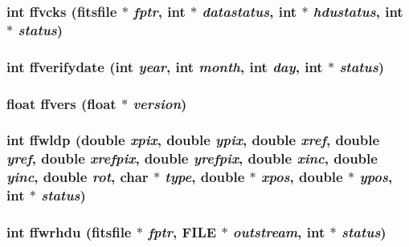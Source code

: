 \subsubsection{\setlength{\rightskip}{0pt plus 5cm}int ffvcks (\bf{fitsfile} $\ast$ {\em fptr}, int $\ast$ {\em datastatus}, int $\ast$ {\em hdustatus}, int $\ast$ {\em status})}\label{src_2fitsio_8h_78bc390746f669a461a78c81ed6d188c}


\subsubsection{\setlength{\rightskip}{0pt plus 5cm}int ffverifydate (int {\em year}, int {\em month}, int {\em day}, int $\ast$ {\em status})}\label{src_2fitsio_8h_80394f484665daa6cc2baf0176437ca8}


\subsubsection{\setlength{\rightskip}{0pt plus 5cm}float ffvers (float $\ast$ {\em version})}\label{src_2fitsio_8h_85c66845501bf130675ce90fede1adb4}


\subsubsection{\setlength{\rightskip}{0pt plus 5cm}int ffwldp (double {\em xpix}, double {\em ypix}, double {\em xref}, double {\em yref}, double {\em xrefpix}, double {\em yrefpix}, double {\em xinc}, double {\em yinc}, double {\em rot}, char $\ast$ {\em type}, double $\ast$ {\em xpos}, double $\ast$ {\em ypos}, int $\ast$ {\em status})}\label{src_2fitsio_8h_d38a3e4f83b4c618ce413d89f7115e45}


\subsubsection{\setlength{\rightskip}{0pt plus 5cm}int ffwrhdu (\bf{fitsfile} $\ast$ {\em fptr}, FILE $\ast$ {\em outstream}, int $\ast$ {\em status})}\label{src_2fitsio_8h_9ad432500aed4437ea1991776af1f5e5}


